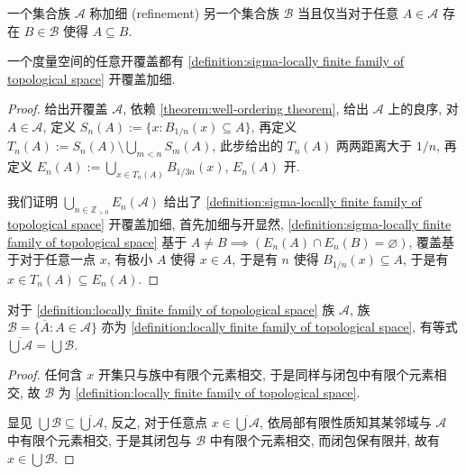 \begin{definition}[集族加细]
    \label {definition:refinement of sets}
    一个集合族 \(\mathcal{A}\) 称加细 (refinement) 另一个集合族 \(\mathcal{B}\) 当且仅当对于任意 \(A \in \mathcal{A}\) 存在 \(B \in \mathcal{B}\) 使得 \(A \subseteq B\).
\end{definition}

\begin{lemma}
    一个度量空间的任意开覆盖都有 \ref{definition:sigma-locally finite family of topological space} 开覆盖加细.

    \begin{proof}
        给出开覆盖 \(\mathcal{A}\), 依赖 \ref{theorem:well-ordering theorem}, 给出 \(\mathcal{A}\) 上的良序,
        对 \(A \in \mathcal{A}\), 定义 \(S_n (A) := \{x : B_{1/n} (x) \subseteq A\}\), 再定义 \(T_n (A) := S_n (A) \setminus \bigcup_{m < n} S_m (A)\),
        此步给出的 \(T_n (A)\) 两两距离大于 \(1/n\), 再定义 \(E_n (A) := \bigcup_{x \in T_n (A)} B_{1/3n} (x)\), \(E_n(A)\) 开.

        我们证明 \(\bigcup_{n \in \mathbb{Z}_{>0}} E_n (\mathcal{A})\) 给出了 \ref{definition:sigma-locally finite family of topological space} 开覆盖加细,
        首先加细与开显然, \ref{definition:sigma-locally finite family of topological space} 基于 \(A \neq B \implies (E_n (A) \cap E_n (B) = \varnothing)\), 
        覆盖基于对于任意一点 \(x\), 有极小 \(A\) 使得 \(x \in A\), 于是有 \(n\) 使得 \(B_{1/n} (x) \subseteq A\), 于是有 \(x \in T_n (A) \subseteq E_n(A)\).
    \end{proof}
\end{lemma}

\begin{lemma}
    \label {lemma:closure of union of locally finite family of topological space}
    对于 \ref{definition:locally finite family of topological space} 族 \(\mathcal{A}\),
    族 \(\mathcal{B} = \{\overline{A} : A \in \mathcal{A}\}\) 亦为 \ref{definition:locally finite family of topological space},
    有等式 \(\overline{\bigcup \mathcal{A}} = \bigcup \mathcal{B}\).

    \begin{proof}
        任何含 \(x\) 开集只与族中有限个元素相交, 于是同样与闭包中有限个元素相交, 故 \(\mathcal{B}\) 为 \ref{definition:locally finite family of topological space}.

        显见 \(\bigcup \mathcal{B} \subseteq \overline{\bigcup \mathcal{A}}\), 反之, 对于任意点 \(x \in \overline{\bigcup \mathcal{A}}\),
        依局部有限性质知其某邻域与 \(\mathcal{A}\) 中有限个元素相交, 于是其闭包与 \(\mathcal{B}\) 中有限个元素相交, 而闭包保有限并, 故有 \(x \in \bigcup \mathcal{B}\).
    \end{proof}
\end{lemma}

